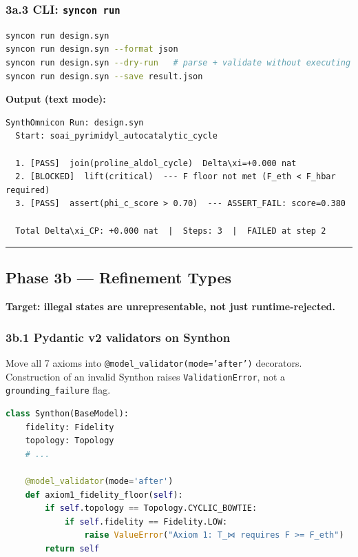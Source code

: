 \documentclass[12pt,a4paper]{article}
\begin{document}
\subsubsection{3a.3 CLI: \texttt{syncon run}}

\begin{lstlisting}[language=bash]
syncon run design.syn
syncon run design.syn --format json
syncon run design.syn --dry-run   # parse + validate without executing
syncon run design.syn --save result.json
\end{lstlisting}

\textbf{Output (text mode):}

\begin{lstlisting}
SynthOmnicon Run: design.syn
  Start: soai_pyrimidyl_autocatalytic_cycle

  1. [PASS]  join(proline_aldol_cycle)  Delta\xi=+0.000 nat
  2. [BLOCKED]  lift(critical)  --- F floor not met (F_eth < F_hbar required)
  3. [PASS]  assert(phi_c_score > 0.70)  --- ASSERT_FAIL: score=0.380

  Total Delta\xi_CP: +0.000 nat  |  Steps: 3  |  FAILED at step 2
\end{lstlisting}

\begin{center}
\rule{0.5\textwidth}{0.4pt}
\end{center}

\subsection{Phase 3b --- Refinement Types}

\textbf{Target: illegal states are unrepresentable, not just runtime-rejected.}

\subsubsection{3b.1 Pydantic v2 validators on Synthon}

Move all 7 axioms into \texttt{@model\_validator(mode='after')} decorators. Construction of an invalid Synthon raises \texttt{ValidationError}, not a \texttt{grounding\_failure} flag.

\begin{lstlisting}[language=Python]
class Synthon(BaseModel):
    fidelity: Fidelity
    topology: Topology
    # ...

    @model_validator(mode='after')
    def axiom1_fidelity_floor(self):
        if self.topology == Topology.CYCLIC_BOWTIE:
            if self.fidelity == Fidelity.LOW:
                raise ValueError("Axiom 1: T_⋈ requires F >= F_eth")
        return self
\end{lstlisting}
\end{document}
